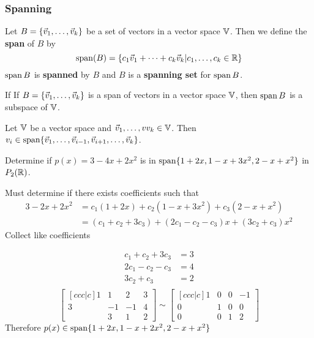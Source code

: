 \documentclass[english, 12pt]{article}
\begin{document}
\subsubsection{Spanning}
\begin{defn}
Let $B = \{\vec{v}_1,\dots,\vec{v}_k\}$ be a set of vectors in a vector space ${\mathbb{V}}$. Then we define the \textbf{span} of $B$ by
\[\operatorname{span}(B) = \{c_1 \vec{v}_1 + \cdots + c_k \vec{v}_k | c_1,\dots,c_k \in {\mathbb{R}}\}\]
$\operatorname{span} B$ is \textbf{spanned} by $B$ and $B$ is a \textbf{spanning set} for $\operatorname{span} B$.
\end{defn}

\begin{thrm}
If
If $B = \{\vec{v}_1,\dots,\vec{v}_k\}$ is a span of vectors in a vector space ${\mathbb{V}}$, then $\operatorname{span} B$ is a subspace of ${\mathbb{V}}$.
\end{thrm}

\begin{thrm}
Let ${\mathbb{V}}$ be a vector space and $\vec{v}_1,\dots,vv_k \in {\mathbb{V}}$. Then $v_i \in \operatorname{span} \{\vec{v}_1,\dots,\vec{v}_{i-1},\vec{v}_{i+1},\dots,\vec{v}_k\}$.
\end{thrm}

\begin{exmp}
Determine if $p(x) = 3 - 4x + 2x^2$ is in $\operatorname{span}\{1+2x,1-x+3x^2,2-x+x^2\}$ in $P_2({\mathbb{R}})$.
\begin{sol}
Must determine if there exists coefficients such that
\begin{align*}
3 - 2x + 2x^2 &= c_{1}(1+2x) + c_{2} (1-x+3x^2) + c_{3}(2-x+x^2) \\
&= (c_{1} + c_{2} + 3 c_{3}) + (2c_{1} - c_{2} - c_{3}) x + (3c_{2} + c_{3})x^2
\end{align*}
Collect like coefficients
\end{sol}
\begin{align*}
c_{1} + c_{2} + 3 c_{3} &= 3 \\
2c_{1} - c_{2} - c_{3} &= 4 \\
3c_{2} + c_{3} &= 2 \\
\end{align*}
\[\begin{bmatrix}[ccc|c] 1 & 1 & 2 & 3 \\ 3 & -1 & -1 & 4 \\  & 3 & 1 & 2 \end{bmatrix} \sim \begin{bmatrix}[ccc|c] 1 & 0 & 0 & -1 \\ 0 & 1 & 0 & 0 \\ 0 & 0 & 1 & 2 \end{bmatrix}\]
Therefore $p(x) \in \operatorname{span}\{1+2x,1-x+2x^2,2-x+x^2\}$
\end{exmp}
\end{document}

